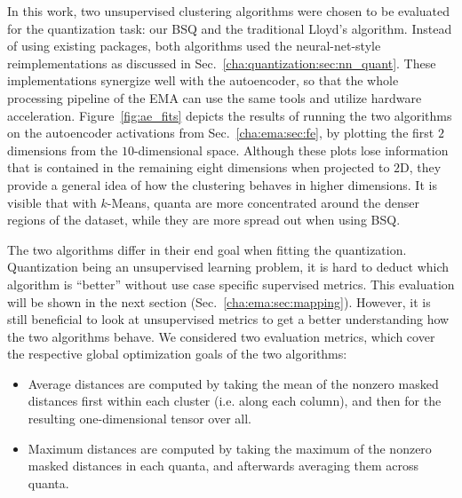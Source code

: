 			In this work, two unsupervised clustering algorithms were chosen to be evaluated for the quantization task: our \ac{BSQ} and the traditional Lloyd's \kmeans{} algorithm.
			Instead of using existing packages, both algorithms used the neural-net-style reimplementations as discussed in Sec.~\ref{cha:quantization:sec:nn_quant}.
			These implementations synergize well with the autoencoder, so that the whole processing pipeline of the \ac{EMA} can use the same tools and utilize hardware acceleration.		
			Figure~\ref{fig:ae_fits} depicts the results of running the two algorithms on the autoencoder activations from Sec.~\ref{cha:ema:sec:fe}, by plotting the first $2$ dimensions from the $10$-dimensional space.
			Although these plots lose information that is contained in the remaining eight dimensions when projected to $2$D, they provide a general idea of how the clustering behaves in higher dimensions.
			It is visible that with $k$-Means, quanta are more concentrated around the denser regions of the dataset, while they are more spread out when using \ac{BSQ}.
			
			The two algorithms differ in their end goal when fitting the quantization.
			Quantization being an unsupervised learning problem, it is hard to deduct which algorithm is ``better'' without use case specific supervised metrics.
			This evaluation will be shown in the next section (Sec.~\ref{cha:ema:sec:mapping}).
			However, it is still beneficial to look at unsupervised metrics to get a better understanding how the two algorithms behave.
			We considered two evaluation metrics, which cover the respective global optimization goals of the two algorithms:			
			\begin{itemize}
				\item Average distances are computed by taking the mean of the nonzero masked distances first within each cluster (i.e. along each column), and then for the resulting one-dimensional tensor over all.
				\item Maximum distances are computed by taking the maximum of the nonzero masked distances in each quanta, and afterwards averaging them across quanta.
			\end{itemize}
			

